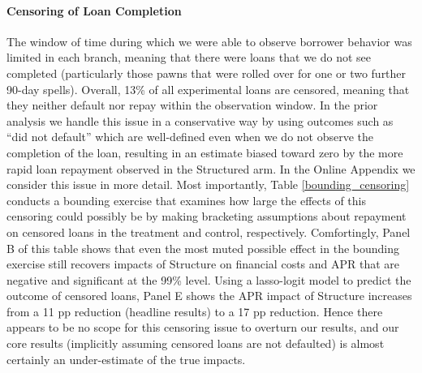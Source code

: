 \documentclass[12pt, a4paper, colorinlistoftodos]{article}
\begin{document}


\paragraph*{Censoring of Loan Completion}
The window of time during which we were able to observe borrower behavior was limited in each branch, meaning that there were loans that we do not see completed (particularly those pawns that were rolled over for one or two further 90-day spells).  Overall, 13\% of all experimental loans are censored, meaning that they neither default nor repay within the observation window.  In the prior analysis we handle this issue in a conservative way by using outcomes such as ``did not default'' which are well-defined even when we do not observe the completion of the loan, resulting in an estimate biased toward zero by the more rapid loan repayment observed in the Structured arm.  In the Online Appendix we consider this issue in more detail.  Most importantly, Table \ref{bounding_censoring} conducts a bounding exercise that examines how large the effects of this censoring could possibly be by making bracketing assumptions about repayment on censored loans in the treatment and control, respectively.  Comfortingly, Panel B of this table shows that even the most muted possible effect in the bounding exercise still recovers impacts of Structure on financial costs and APR that are negative and significant at the 99\% level.  Using a lasso-logit model to predict the outcome of censored loans, Panel E shows the APR impact of Structure increases from a 11 pp reduction (headline results) to a 17 pp reduction.  Hence there appears to be no scope for this censoring issue to overturn our results, and our core results (implicitly assuming censored loans are not defaulted) is almost certainly an under-estimate of the true impacts.
\end{document}
